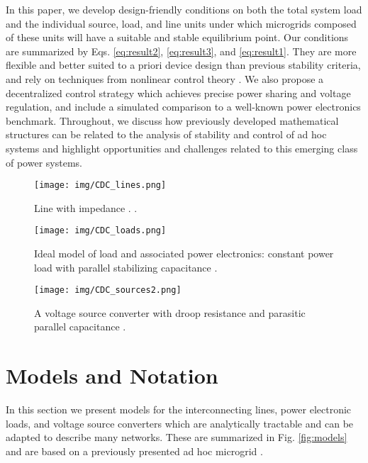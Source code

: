 \documentclass[letterpaper, 10 pt, conference]{ieeeconf}
\begin{document}
In this paper, we develop design-friendly conditions on both the total system load and the individual source, load, and line units under which microgrids composed of these units will have a suitable and stable equilibrium point. Our conditions are summarized by Eqs. \eqref{eq:result2}, \eqref{eq:result3}, and \eqref{eq:result1}. They are more flexible and better suited to a priori device design than previous stability criteria, and rely on techniques from nonlinear control theory \cite{Brayton:1964gr,Jeltsema:2003jz,Jeltsema:2009jd,Feijer:2010ia}. We also propose a decentralized control strategy which achieves precise power sharing and voltage regulation, and include a simulated comparison to a well-known power electronics benchmark. Throughout, we discuss how previously developed mathematical structures can be related to the analysis of stability and control of ad hoc systems and highlight opportunities and challenges related to this emerging class of power systems.

\begin{figure*}[b!]
\begin{subfigure}{.271\textwidth}
  \centering
  \texttt{[image: img/CDC\_lines.png]}
  \caption{Line with impedance . .\newline}
  \label{fig:line}
\end{subfigure}
\hfill
\begin{subfigure}{.314\textwidth}
  \centering
  \texttt{[image: img/CDC\_loads.png]}
  \caption{Ideal model of load and associated power electronics: constant power load with parallel stabilizing capacitance .}
  \label{fig:load}
\end{subfigure}
\hfill
\begin{subfigure}{.314\textwidth}
  \centering
  \texttt{[image: img/CDC\_sources2.png]}
  \caption{A voltage source converter with droop resistance  and parasitic parallel capacitance .}
  \label{fig:source}
\end{subfigure}
\caption{Representations of lines, loads, and sources in our dc microgrid.}
\label{fig:models}
\end{figure*}

\section{Models and Notation}\label{sec:models}

In this section we present models for the interconnecting lines, power electronic loads, and voltage source converters which are analytically tractable and can be adapted to describe many networks. These are summarized in Fig. \ref{fig:models} and are based on a previously presented ad hoc microgrid \cite{ugrid}.
\end{document}
